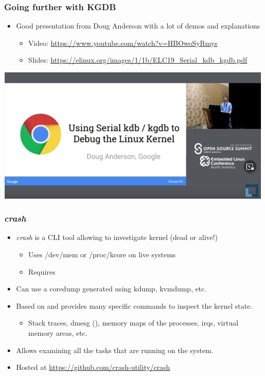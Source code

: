 \begin{frame}[fragile]
  \frametitle{Going further with KGDB}
  \begin{itemize}
    \item Good presentation from Doug Anderson with a lot of demos and
          explanations
    \begin{itemize}
      \item Video: \url{https://www.youtube.com/watch?v=HBOwoSyRmys}
      \item Slides: \url{https://elinux.org/images/1/1b/ELC19_Serial_kdb_kgdb.pdf}
    \end{itemize}
  \end{itemize}
  \vspace{0.5cm}
  \begin{center}
  \center\includegraphics[height=0.5\textheight]{slides/debugging-kernel-debugging/kgdb_conf.png}
  \end{center}
\end{frame}

\begin{frame}
  \frametitle{{\em crash}}
  \begin{itemize}
    \item {\em crash} is a CLI tool allowing to investigate kernel (dead or
      alive!)
    \begin{itemize}
      \item Uses /dev/mem or /proc/kcore on live systems
      \item Requires 
    \end{itemize}
    \item Can use a coredump generated using kdump, kvmdump, etc.
    \item Based on  and provides many specific commands to inspect the
      kernel state.
    \begin{itemize}
      \item Stack traces, dmesg (), memory maps of the processes,
            irqs, virtual memory areas, etc.
    \end{itemize}
    \item Allows examining all the tasks that are running on the system.
    \item Hosted at \url{https://github.com/crash-utility/crash}
  \end{itemize}
\end{frame}

